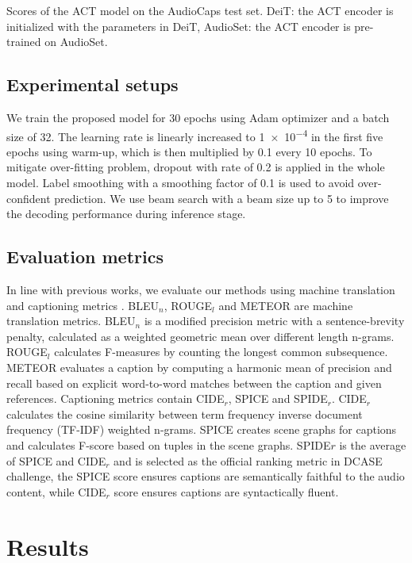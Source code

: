 \documentclass{article}
\begin{document}
\begin{sloppy}
\begin{table*}[ht]
\caption{Scores of the ACT model on the AudioCaps test set. DeiT: the ACT encoder is initialized with the parameters in DeiT, AudioSet: the ACT encoder is pre-trained on AudioSet.}
\label{table:tab_results} 
\end{table*}

\subsection{Experimental setups}
\label{ssec:exp_setup}
We train the proposed model for \num{30} epochs using Adam optimizer \cite{kingma2014adam} and a batch size of \num{32}. The learning rate is linearly increased to \num{1e-4} in the first five epochs using warm-up, which is then multiplied by \num{0.1} every \num{10} epochs. To mitigate over-fitting problem, dropout with rate of \num{0.2} is applied in the whole model. Label smoothing \cite{szegedy2016labelsmoothing} with a smoothing factor of \num{0.1} is used to avoid over-confident prediction. We use beam search with a beam size up to \num{5} to improve the decoding performance during inference stage.

\subsection{Evaluation metrics}
\label{ssec:metrics}


In line with previous works, we evaluate our methods using machine translation and captioning metrics \cite{tran2020wavetransformer}. BLEU$_{n}$, ROUGE$_{l}$ and METEOR are machine translation metrics. BLEU$_n$ is a modified precision metric with a sentence-brevity penalty, calculated as a weighted geometric mean over different length n-grams. ROUGE$_{l}$ calculates F-measures by counting the longest common subsequence. METEOR evaluates a caption by computing a harmonic mean of precision and recall based on explicit word-to-word matches between the caption and given references. Captioning metrics contain CIDE$_{r}$, SPICE and SPIDE$_r$. CIDE$_{r}$ calculates the cosine similarity between term frequency inverse document frequency (TF-IDF) weighted n-grams. SPICE creates scene graphs for captions and calculates F-score based on tuples in the scene graphs. SPIDE${r}$ is the average of SPICE and CIDE$_{r}$ and is selected as the official ranking metric in DCASE challenge, the SPICE score ensures captions are semantically faithful to the audio content, while CIDE$_{r}$ score ensures captions are syntactically fluent. 
\section{Results}
\label{sec:results}

\end{sloppy}
\end{document}

